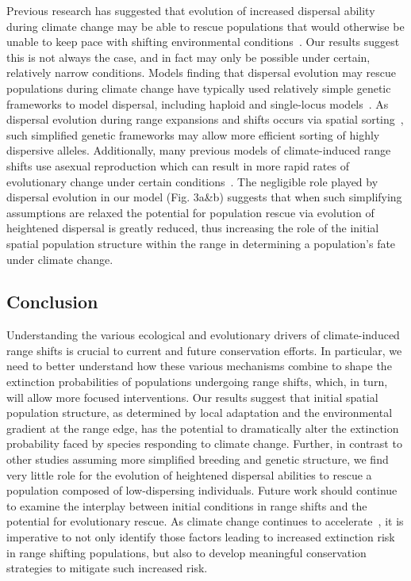 \documentclass[12pt, oneside]{article}
\begin{document}
Previous research has suggested that evolution of increased dispersal ability during climate change may be able to rescue populations that would otherwise be unable to keep pace with shifting environmental conditions~\citep{boeye2013more}. Our results suggest this is not always the case, and in fact may only be possible under certain, relatively narrow conditions. Models finding that dispersal evolution may rescue populations during climate change have typically used relatively simple genetic frameworks to model dispersal, including haploid and single-locus models~\citep{boeye2013more, hargreaves2015fitness}. As dispersal evolution during range expansions and shifts occurs via spatial sorting~\citep{shine2011evolutionary}, such simplified genetic frameworks may allow more efficient sorting of highly dispersive alleles. Additionally, many previous models of climate-induced range shifts use asexual reproduction which can result in more rapid rates of evolutionary change under certain conditions~\citep{crow1965evolution, smith1968evolution}. The negligible role played by dispersal evolution in our model (Fig. 3a\&b) suggests that when such simplifying assumptions are relaxed the potential for population rescue via evolution of heightened dispersal is greatly reduced, thus increasing the role of the initial spatial population structure within the range in determining a population's fate under climate change.

\subsection*{Conclusion}
Understanding the various ecological and evolutionary drivers of climate-induced range shifts is crucial to current and future conservation efforts. In particular, we need to better understand how these various mechanisms combine to shape the extinction probabilities of populations undergoing range shifts, which, in turn, will allow more focused interventions. Our results suggest that initial spatial population structure, as determined by local adaptation and the environmental gradient at the range edge, has the potential to dramatically alter the extinction probability faced by species responding to climate change. Further, in contrast to other studies assuming more simplified breeding and genetic structure, we find very little role for the evolution of heightened dispersal abilities to rescue a population composed of low-dispersing individuals. Future work should continue to examine the interplay between initial conditions in range shifts and the potential for evolutionary rescue. As climate change continues to accelerate~\citep{chen2017increasing}, it is imperative to not only identify those factors leading to increased extinction risk in range shifting populations, but also to develop meaningful conservation strategies to mitigate such increased risk.
\end{document}
